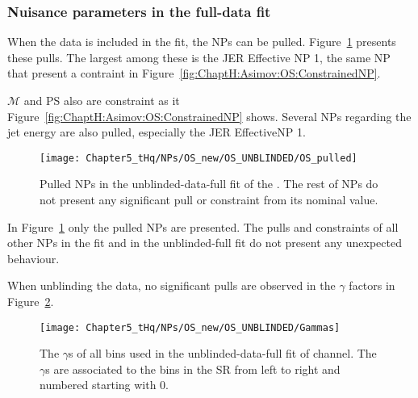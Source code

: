 \subsubsection{Nuisance parameters in the \dilepOStau full-data fit}
\label{sec:ChaptH:Fit:FullFit:OS:NPs}

When the data is included in the fit, the NPs can be pulled. Figure~\ref{fig:ChaptH:fitToData:OS:PulledNPs}
presents these pulls. The largest among these is the JER Effective NP 1, the same NP that
present a contraint in Figure~\ref{fig:ChaptH:Asimov:OS:ConstrainedNP}.

 \ttbar $\mathcal{M}$ and \ttbar PS also are constraint as
it Figure~\ref{fig:ChaptH:Asimov:OS:ConstrainedNP} shows. Several NPs regarding the jet energy are
also pulled, especially the JER EffectiveNP 1.

\begin{figure}[h]
\centering
\texttt{[image: Chapter5\_tHq/NPs/OS\_new/OS\_UNBLINDED/OS\_pulled]}
\caption{Pulled NPs in the unblinded-data-full fit of the \dilepOStau. 
The rest of NPs do not present any significant pull or constraint from its nominal value.}  
\label{fig:ChaptH:fitToData:OS:PulledNPs}
\end{figure}

In Figure~\ref{fig:ChaptH:fitToData:OS:PulledNPs} only the pulled NPs are presented.
The pulls and constraints of all other NPs in the  fit and in the unblinded-full fit 
do not present  any unexpected behaviour. 

When unblinding the data, no significant pulls are observed in the $\gamma$ factors 
in Figure~\ref{fig:ChaptH:fitToData:OS:Gammas}. 
\begin{figure}[h]
\centering
 \texttt{[image: Chapter5\_tHq/NPs/OS\_new/OS\_UNBLINDED/Gammas]}
\caption{The $\gamma$s of all bins used in the unblinded-data-full fit of \dilepOStau channel.
The $\gamma$s are associated to the bins in the SR from left to right
and numbered starting with 0.} 
\label{fig:ChaptH:fitToData:OS:Gammas}
\end{figure}


